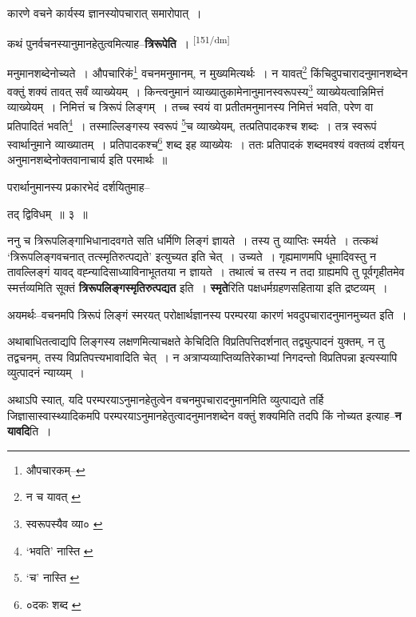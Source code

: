 \documentclass[article,12pt,a4paper]{memoir}
\begin{document}
	  \pstart कारणे वचने कार्यस्य ज्ञानस्योपचारात् समारोपात् ।
	\pend
      

	  \pstart कथं पुनर्वचनस्यानुमानहेतुत्वमित्याह--\textbf{त्रिरूपेति} ।
	\pend
      \leavevmode\textsuperscript{\rmlatinfont\tiny [151/dm]}

	  \pstart मनुमानशब्देनोच्यते । औपचारिकं\footnote{औपचारकम्--\cite{dp-msA}} वचनमनुमानम्, न मुख्यमित्यर्थः । न यावत्\footnote{न च यावत् \cite{dp-msA} \cite{dp-msB} \cite{dp-msD} \cite{dp-edP} \cite{dp-edH} \cite{dp-edE} \cite{dp-edN}} किंचिदुपचारादनुमानशब्देन वक्तुं शक्यं तावत् सर्वं व्याख्येयम् । किन्त्वनुमानं व्याख्यातुकामेनानुमानस्वरूपस्य\footnote{स्वरूपस्यैव व्या० \cite{dp-msC}} व्याख्येयत्वान्निमित्तं व्याख्येयम् । निमित्तं च त्रिरूपं लिङ्गम् । तच्च स्वयं वा प्रतीतमनुमानस्य निमित्तं भवति, परेण वा प्रतिपादितं भवति\footnote{‘भवति’ नास्ति \cite{dp-msA} \cite{dp-msC} \cite{dp-edP} \cite{dp-edE} \cite{dp-edN}} । तस्माल्लिङ्गस्य स्वरूपं \footnote{‘च’ नास्ति \cite{dp-msA} \cite{dp-edP} \cite{dp-edH} \cite{dp-edE} \cite{dp-edN}}च व्याख्येयम्, तत्प्रतिपादकश्च शब्दः । तत्र स्वरूपं स्वार्थानुमाने व्याख्यातम् । प्रतिपादकश्च\footnote{०दकः शब्द \cite{dp-msA} \cite{dp-msB} \cite{dp-edP} \cite{dp-edH} \cite{dp-edE} \cite{dp-edN}} शब्द इह व्याख्येयः । ततः प्रतिपादकं शब्दमवश्यं वक्तव्यं दर्शयन् अनुमानशब्देनोक्तवानाचार्य इति परमार्थः ॥
	\pend
       

	  \pstart परार्थानुमानस्य प्रकारभेदं दर्शयितुमाह--
	\pend
      

	  \pstart तद् द्विविधम् ॥ ३ ॥
	\pend
      

	  \pstart ननु च त्रिरूपलिङ्गाभिधानादवगते सति धर्मिणि लिङ्गं ज्ञायते । तस्य तु व्याप्तिः स्मर्यते । तत्कथं ‘त्रिरूपलिङ्गवचनात् तत्स्मृतिरुत्पद्यते’ इत्युच्यत इति चेत् । उच्यते । गृह्यमाणमपि धूमादिवस्तु न तावल्लिङ्गं यावद् वह्न्यादिसाध्याविनाभूततया न ज्ञायते । तथात्वं च तस्य न तदा ग्राह्यमपि तु पूर्वगृहीतमेव स्मर्त्तव्यमिति सूक्तं \textbf{त्रिरूपलिङ्गस्मृतिरुत्पद्यत} इति । \textbf{स्मृते}रिति पक्षधर्मग्रहणसहिताया इति द्रष्टव्यम् ।
	\pend
      

	  \pstart अयमर्थः--वचनमपि त्रिरूपं लिङ्गं स्मरयत् परोक्षार्थज्ञानस्य परम्परया कारणं भवदुपचारादनुमानमुच्यत इति ।
	\pend
      

	  \pstart अथाबाधितत्वाद्यपि लिङ्गस्य लक्षणमित्याचक्षते केचिदिति विप्रतिपत्तिदर्शनात् तद्व्युत्पादनं युक्तम्, न तु तद्वचनम्, तस्य विप्रतिपत्त्यभावादिति चेत् । न अत्राप्यव्याप्तिव्यतिरेकाभ्यां निगदन्तो विप्रतिपन्ना इत्यस्यापि व्युत्पादनं न्याय्यम् ।
	\pend
      

	  \pstart अथाऽपि स्यात्, यदि परम्परयाऽनुमानहेतुत्वेन वचनमुपचारादनुमानमिति व्युत्पाद्यते तर्हि जिज्ञासास्वास्थ्यादिकमपि परम्परयाऽनुमानहेतुत्वादनुमानशब्देन वक्तुं शक्यमिति तदपि किं नोच्यत इत्याह--\textbf{न यावदि}ति ।
	\pend
      
\end{document}
